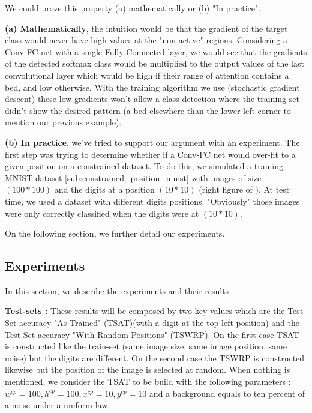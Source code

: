 			We could prove this property (a) mathematically or (b) "In practice".

			\textbf{(a) Mathematically}, the intuition would be that the gradient of the target class would never have high values at the "non-active" regions. Considering a Conv-FC net with a single Fully-Connected layer, we would see that the gradients of the detected softmax class would be multiplied to the output values of the last convolutional layer which would be high if their range of attention contains a bed, and low otherwise. With the training algorithm we use (stochastic gradient descent) these low gradients won't allow a class detection where the training set didn't show the desired pattern (a bed elsewhere than the lower left corner to mention our previous example).

			\textbf{(b) In practice}, we've tried to support our argument with an experiment. The first step was trying to determine whether if a Conv-FC net would over-fit to a given position on a constrained dataset. To do this, we simulated a training MNIST dataset \ref{sub:constrained_position_mnist} with images of size $(100*100)$ and the digits at a position $(10*10)$ (right figure of ). At test time, we used a dataset with different digits positions. "Obviously" those images were only correctly classified when the digits were at $(10*10)$. 

			On the following section, we further detail our experiments.

		\subsection{Experiments}
		\label{sub:experiments}
			In this section, we describe the experiments and their results. 

			\textbf{Test-sets :} These results will be composed by two key values which are the Test-Set accuracy "As Trained" (TSAT)(with a digit at the top-left position) and the Test-Set accuracy "With Random Positions" (TSWRP). On the first case TSAT is constructed like the train-set (same image size, same image position, same noise) but the digits are different. On the second case the TSWRP is constructed likewise but the position of the image is selected at random. 
			When nothing is mentioned, we consider the TSAT to be build with the following parameters : $w^{cp}=100,h^{cp}=100, x^{cp}=10,y^{cp}=10$ and a background equals to ten percent of a noise under a uniform law.

